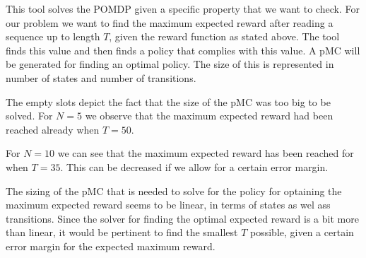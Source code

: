 This tool solves the POMDP given a specific property that we want to check. For our problem we want to find the maximum expected reward after reading a sequence up to length $T$, given the reward function as stated above. The tool finds this value and then finds a policy that complies with this value. A pMC will be generated for finding an optimal policy. The size of this is represented in number of states and number of transitions. 

The empty slots depict the fact that the size of the pMC was too big to be solved. 
%
%
For $N=5$ we observe that the maximum expected reward had been reached already when $T=50$.

For $N=10$ we can see that the maximum expected reward has been reached for when $T=35$. This can be decreased if we allow for a certain error margin.

The sizing of the pMC that is needed to solve for the policy for optaining the maximum expected reward seems to be linear, in terms of states as wel ass transitions. Since the solver for finding the optimal expected reward is a bit more than linear, it would be pertinent to find the smallest $T$ possible, given a certain error margin for the expected maximum reward.
